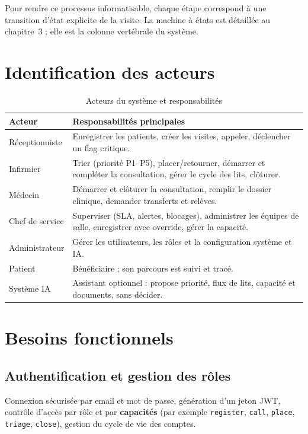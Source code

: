 Pour rendre ce processus informatisable, chaque étape correspond à une transition d'état explicite de la visite. La machine à états est détaillée au chapitre~3 ; elle est la colonne vertébrale du système.

\section{Identification des acteurs}

\begin{table}[H]
\centering
\caption{Acteurs du système et responsabilités}
\label{tab:acteurs}
\small
\begin{tabular}{|l|p{9cm}|}
\hline
\textbf{Acteur} & \textbf{Responsabilités principales} \\
\hline
Réceptionniste & Enregistrer les patients, créer les visites, appeler, déclencher un flag critique. \\
\hline
Infirmier & Trier (priorité P1--P5), placer/retourner, démarrer et compléter la consultation, gérer le cycle des lits, clôturer. \\
\hline
Médecin & Démarrer et clôturer la consultation, remplir le dossier clinique, demander transferts et relèves. \\
\hline
Chef de service & Superviser (SLA, alertes, blocages), administrer les équipes de salle, enregistrer avec override, gérer la capacité. \\
\hline
Administrateur & Gérer les utilisateurs, les rôles et la configuration système et IA. \\
\hline
Patient & Bénéficiaire ; son parcours est suivi et tracé. \\
\hline
Système IA & Assistant optionnel : propose priorité, flux de lits, capacité et documents, sans décider. \\
\hline
\end{tabular}
\end{table}

\section{Besoins fonctionnels}

\subsection{Authentification et gestion des rôles}

Connexion sécurisée par email et mot de passe, génération d'un jeton JWT, contrôle d'accès par rôle et par \textbf{capacités} (par exemple \texttt{register}, \texttt{call}, \texttt{place}, \texttt{triage}, \texttt{close}), gestion du cycle de vie des comptes.

